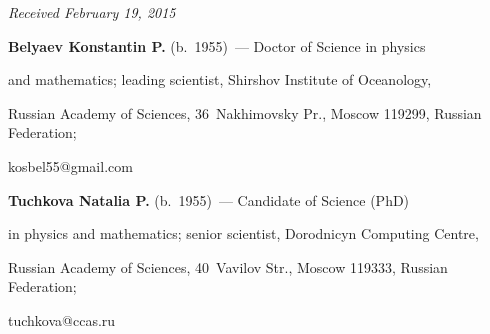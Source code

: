 


\vspace*{-3pt}



\hfill{\small\textit{Received February 19, 2015}}






\Contr



\noindent

\textbf{Belyaev Konstantin P.} (b.\ 1955)~--- Doctor of Science in physics

and mathematics; leading scientist, Shirshov Institute of Oceanology,

Russian Academy of Sciences, 36~Nakhimovsky Pr., Moscow 119299, Russian Federation;

kosbel55@gmail.com



\vspace*{3pt}



\noindent

\textbf{Tuchkova Natalia P.} (b.\ 1955)~--- Candidate of Science (PhD)

in physics and mathematics; senior scientist, Dorodnicyn Computing Centre,

Russian Academy of Sciences, 40~Vavilov Str., Moscow 119333, Russian Federation;

tuchkova@ccas.ru





\label{end\stat}





\renewcommand{\bibname}{\protect\rm Литература} 